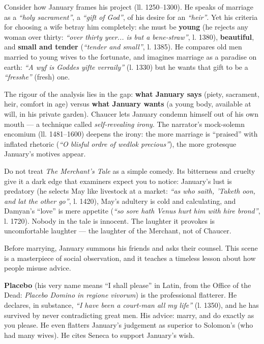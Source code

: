 \documentclass[11pt]{article}
\newcounter{popsec}
\newcounter{popsub}
\newcommand{\courssub}[1]{%
  \stepcounter{popsub}%
  \par\vspace{9pt}\noindent{\popxbold\fontsize{11.5}{13}\selectfont\color{popink}{\color{poporange}\thepopsec.\thepopsub}\hspace{6pt}#1}\par\nopagebreak\vspace{4pt}
}
\begin{document}
\begin{exemplebox}
Consider how January frames his project (ll. 1250--1300). He speaks of marriage as a \emph{``holy sacrament''}, a \emph{``gift of God''}, of his desire for an \emph{``heir''}. Yet his criteria for choosing a wife betray him completely: she must be \textbf{young} (he rejects any woman over thirty: \emph{``over thirty yeer... is but a bene-straw''}, l. 1380), \textbf{beautiful}, and \textbf{small and tender} (\emph{``tender and small''}, l. 1385). He compares old men married to young wives to the fortunate, and imagines marriage as a paradise on earth: \emph{``A wyf is Goddes yifte verraily''} (l. 1330) but he wants that gift to be a \emph{``fresshe''} (fresh) one.
\par\smallskip
The rigour of the analysis lies in the gap: \textbf{what January says} (piety, sacrament, heir, comfort in age) versus \textbf{what January wants} (a young body, available at will, in his private garden). Chaucer lets January condemn himself out of his own mouth --- a technique called \emph{self-revealing irony}. The narrator's mock-solemn encomium (ll. 1481--1600) deepens the irony: the more marriage is ``praised'' with inflated rhetoric (\emph{``O blisful ordre of wedlok precious''}), the more grotesque January's motives appear.
\end{exemplebox}

\begin{attention}
Do not treat \emph{The Merchant's Tale} as a simple comedy. Its bitterness and cruelty give it a dark edge that examiners expect you to notice: January's lust is predatory (he selects May like livestock at a market: \emph{``as who saith, 'Taketh oon, and lat the other go''}, l. 1420), May's adultery is cold and calculating, and Damyan's ``love'' is mere appetite (\emph{``so sore hath Venus hurt him with hire brond''}, l. 1720). Nobody in the tale is innocent. The laughter it provokes is uncomfortable laughter --- the laughter of the Merchant, not of Chaucer.
\end{attention}

\courssub{The Marriage Debate: Placebo versus Justinus}

Before marrying, January summons his friends and asks their counsel. This scene is a masterpiece of social observation, and it teaches a timeless lesson about how people misuse advice.

\textbf{Placebo} (his very name means ``I shall please'' in Latin, from the Office of the Dead: \emph{Placebo Domino in regione vivorum}) is the professional flatterer. He declares, in substance, \emph{``I have been a court-man all my life''} (l. 1350), and he has survived by never contradicting great men. His advice: marry, and do exactly as you please. He even flatters January's judgement as superior to Solomon's (who had many wives). He cites Seneca to support January's wish.
\end{document}
